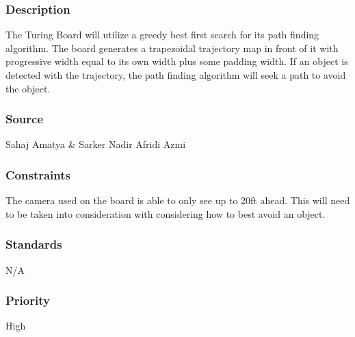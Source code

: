 \subsubsection{Description}
The Turing Board will utilize a greedy best first search for its path finding algorithm. The board generates a trapezoidal trajectory map in front of it with progressive width equal to its own width plus some padding width. If an object is detected with the trajectory, the path finding algorithm will seek a path to avoid the object.
\subsubsection{Source}
Sahaj Amatya \& Sarker Nadir Afridi Azmi
\subsubsection{Constraints}
The camera used on the board is able to only see up to 20ft ahead. This will need to be taken into consideration with considering how to best avoid an object.
\subsubsection{Standards}
N/A
\subsubsection{Priority}
High
